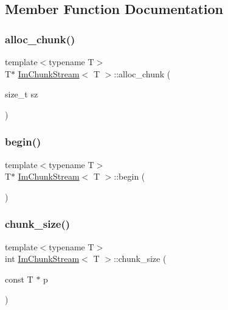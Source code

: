 \subsection{Member Function Documentation}
\mbox{\label{structImChunkStream_abe839ee96b7507850073541509998d1f}} 
\subsubsection{\texorpdfstring{alloc\+\_\+chunk()}{alloc\_chunk()}}
{\footnotesize\ttfamily template$<$typename T$>$ \\
T$\ast$ \hyperlink{structImChunkStream}{Im\+Chunk\+Stream}$<$ T $>$\+::alloc\+\_\+chunk (\begin{DoxyParamCaption}\item[{size\+\_\+t}]{sz }\end{DoxyParamCaption})\hspace{0.3cm}{\ttfamily [inline]}}

\mbox{\label{structImChunkStream_a7cf0b26462edf55fba30b1a32de10117}} 
\subsubsection{\texorpdfstring{begin()}{begin()}}
{\footnotesize\ttfamily template$<$typename T$>$ \\
T$\ast$ \hyperlink{structImChunkStream}{Im\+Chunk\+Stream}$<$ T $>$\+::begin (\begin{DoxyParamCaption}{ }\end{DoxyParamCaption})\hspace{0.3cm}{\ttfamily [inline]}}

\mbox{\label{structImChunkStream_a1a83609aaee47cf8b59a8ae09a04a06b}} 
\subsubsection{\texorpdfstring{chunk\+\_\+size()}{chunk\_size()}}
{\footnotesize\ttfamily template$<$typename T$>$ \\
int \hyperlink{structImChunkStream}{Im\+Chunk\+Stream}$<$ T $>$\+::chunk\+\_\+size (\begin{DoxyParamCaption}\item[{const T $\ast$}]{p }\end{DoxyParamCaption})\hspace{0.3cm}{\ttfamily [inline]}}

